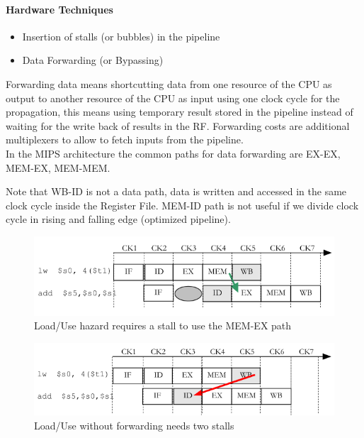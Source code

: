 \paragraph{Hardware Techniques}
\begin{itemize}
    \item[\textrightarrow] Insertion of stalls (or bubbles) in the pipeline
    \item[\textrightarrow] Data Forwarding (or Bypassing)
\end{itemize}

Forwarding data means shortcutting data from one resource of the CPU as output to another resource of the CPU as
input using one clock cycle for the propagation, this means using temporary result stored in the pipeline instead of
waiting for the write back of results in the RF\@.
Forwarding costs are additional multiplexers to allow to fetch inputs from the pipeline.\\
In the MIPS architecture the common paths for data forwarding are EX-EX, MEM-EX, MEM-MEM\@.

Note that WB-ID is not a data path, data is written and accessed in the same clock cycle inside the Register File.
MEM-ID path is not useful if we divide clock cycle in rising and falling edge (optimized pipeline).


\begin{figure}[h]
    \centering
    \includegraphics[scale=0.5]{images/load-use-hazard}
    \caption{Load/Use hazard requires a stall to use the MEM-EX path}
    \label{fig:load-use-hazard}
\end{figure}


\begin{figure}[h]
    \centering
    \includegraphics[scale=0.5]{images/load-use-without-forwarding}
    \caption{Load/Use without forwarding needs two stalls}
    \label{fig:load-use-without-forwarding}
\end{figure}


